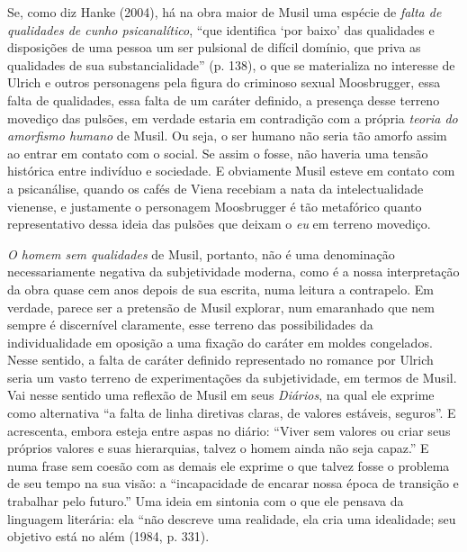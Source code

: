 Se, como diz Hanke (2004), há na obra maior de Musil uma espécie de
\emph{falta de qualidades de cunho psicanalítico}, ``que identifica `por
baixo' das qualidades e disposições de uma pessoa um ser pulsional de
difícil domínio, que priva as qualidades de sua substancialidade'' (p.
138), o que se materializa no interesse de Ulrich e outros personagens
pela figura do criminoso sexual Moosbrugger, essa falta de qualidades,
essa falta de um caráter definido, a presença desse terreno movediço das
pulsões, em verdade estaria em contradição com a própria \emph{teoria do
amorfismo humano} de Musil. Ou seja, o ser humano não seria tão amorfo
assim ao entrar em contato com o social. Se assim o fosse, não haveria
uma tensão histórica entre indivíduo e sociedade. E obviamente Musil
esteve em contato com a psicanálise, quando os cafés de Viena recebiam a
nata da intelectualidade vienense, e justamente o personagem Moosbrugger
é tão metafórico quanto representativo dessa ideia das pulsões que
deixam o \emph{eu} em terreno movediço.

\emph{O homem sem qualidades} de Musil, portanto, não é uma denominação
necessariamente negativa da subjetividade moderna, como é a nossa
interpretação da obra quase cem anos depois de sua escrita, numa leitura
a contrapelo. Em verdade, parece ser a pretensão de Musil explorar, num
emaranhado que nem sempre é discernível claramente, esse terreno das
possibilidades da individualidade em oposição a uma fixação do caráter
em moldes congelados. Nesse sentido, a falta de caráter definido
representado no romance por Ulrich seria um vasto terreno de
experimentações da subjetividade, em termos de Musil. Vai nesse sentido
uma reflexão de Musil em seus \emph{Diários}, na qual ele exprime como
alternativa ``a falta de linha diretivas claras, de valores estáveis,
seguros''. E acrescenta, embora esteja entre aspas no diário: ``Viver
sem valores ou criar seus próprios valores e suas hierarquias, talvez o
homem ainda não seja capaz.'' E numa frase sem coesão com as demais ele
exprime o que talvez fosse o problema de seu tempo na sua visão: a
``incapacidade de encarar nossa época de transição e trabalhar pelo
futuro.'' Uma ideia em sintonia com o que ele pensava da linguagem
literária: ela ``não descreve uma realidade, ela cria uma idealidade;
seu objetivo está no além (1984, p. 331).

